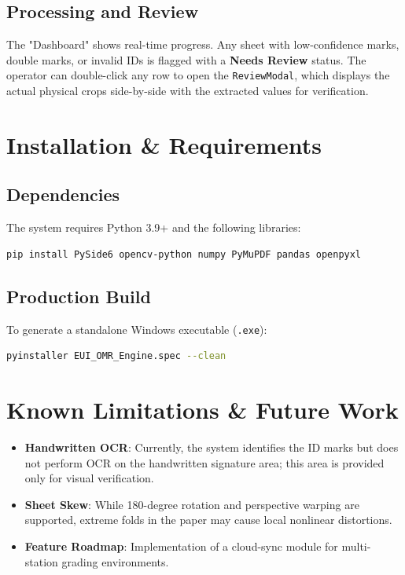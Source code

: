 \documentclass[a4paper,12pt]{article}
\begin{document}
\subsection{Processing and Review}
The "Dashboard" shows real-time progress. Any sheet with low-confidence marks, double marks, or invalid IDs is flagged with a \textbf{Needs Review} status. The operator can double-click any row to open the \texttt{ReviewModal}, which displays the actual physical crops side-by-side with the extracted values for verification.

\section{Installation \& Requirements}
\subsection{Dependencies}
The system requires Python 3.9+ and the following libraries:
\begin{lstlisting}[language=bash]
pip install PySide6 opencv-python numpy PyMuPDF pandas openpyxl
\end{lstlisting}

\subsection{Production Build}
To generate a standalone Windows executable (\texttt{.exe}):
\begin{lstlisting}[language=bash]
pyinstaller EUI_OMR_Engine.spec --clean
\end{lstlisting}

\section{Known Limitations \& Future Work}
\begin{itemize}
    \item \textbf{Handwritten OCR}: Currently, the system identifies the ID marks but does not perform OCR on the handwritten signature area; this area is provided only for visual verification.
    \item \textbf{Sheet Skew}: While 180-degree rotation and perspective warping are supported, extreme folds in the paper may cause local nonlinear distortions.
    \item \textbf{Feature Roadmap}: Implementation of a cloud-sync module for multi-station grading environments.
\end{itemize}
\end{document}
